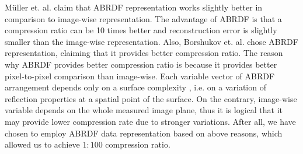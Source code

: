  
M{\"u}ller et. al. \cite{mueller-2003-compression, haindl} claim that ABRDF representation works slightly better in comparison to image-wise representation. 
The advantage of ABRDF is that a compression ratio can be 10 times better and reconstruction error is slightly smaller than the image-wise representation.
Also, Borshukov et. al. \cite[Ch.\ 15]{gpu_gems} chose ABRDF representation, claiming that it provides better compression ratio.
The reason why ABRDF provides better compression ratio is because it provides better pixel-to-pixel comparison than image-wise. 
Each variable vector of ABRDF arrangement depends only on a surface complexity \cite{mueller-2003-compression}, i.e. 
on a variation of reflection properties at a spatial point of the surface.
On the contrary, image-wise variable depends on the whole measured image plane, thus it is logical that it may provide lower compression rate due to stronger variations.
After all, we have chosen to employ ABRDF data representation based on above reasons, which allowed us to achieve $1:100$ compression ratio. 
